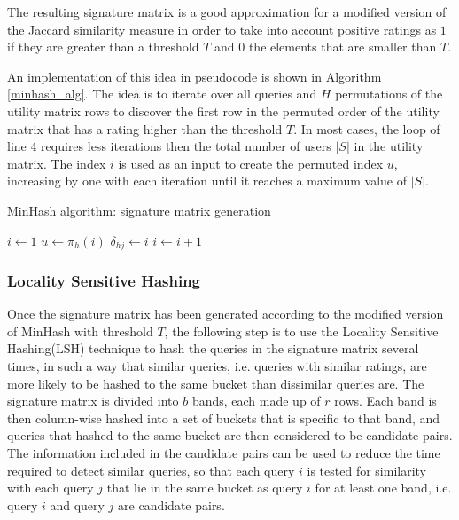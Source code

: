 The resulting signature matrix is a good approximation for a modified version of the Jaccard similarity measure in order to take into account positive ratings as $1$ if they are greater than a threshold $T$ and $0$ the elements that are smaller than $T$. 

An implementation of this idea in pseudocode is shown in Algorithm \ref{minhash_alg}. The idea is to iterate over all queries and $H$ permutations of the utility matrix rows to discover the first row in the permuted order of the utility matrix that has a rating higher than the threshold $T$. In most cases, the loop of line 4 requires less iterations then the total number of users $|S|$ in the utility matrix.
The index $i$ is used as an input to create the permuted index $u$, increasing by one with each iteration until it reaches a maximum value of $|S|$. 

\begin{algorithm}[h]
    \caption{MinHash algorithm: signature matrix generation} 
    \begin{algorithmic}[1]
                \State $i \gets 1$ 
                    \State $u \gets \pi_h(i)$ 
                        \State $\delta_{hj} \gets i$
                    \EndIf
                    \State $i \gets i + 1$
                \EndWhile
            \EndFor
        \EndFor
    \end{algorithmic} 
    \label{minhash_alg}
\end{algorithm}

\subsubsection{Locality Sensitive Hashing} \label{lsh_description}
Once the signature matrix has been generated according to the modified version of MinHash with threshold $T$, the following step is to use the Locality Sensitive Hashing(LSH) technique to hash the queries in the signature matrix several times, in such a way that similar queries, i.e. queries with similar ratings, are more likely to be hashed to the same bucket than dissimilar queries are. The signature matrix is divided into $b$ bands, each made up of $r$ rows. Each band is then column-wise hashed into a set of buckets that is specific to that band, and queries that hashed to the same bucket are then considered to be candidate pairs. The information included in the candidate pairs can be used to reduce the time required to detect similar queries, so that each query $i$ is tested for similarity with each query $j$ that lie in the same bucket as query $i$ for at least one band, i.e. query $i$ and query $j$ are candidate pairs. 

